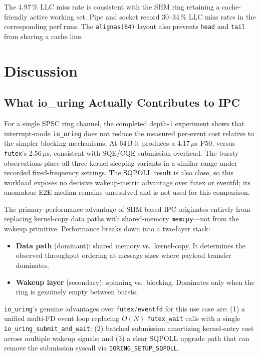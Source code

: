 \documentclass[10pt,conference]{IEEEtran}
\begin{document}
The 4.97\,\% LLC miss rate is consistent with the SHM ring retaining a
cache-friendly active working set. Pipe and socket record 30--34\,\% LLC miss
rates in the corresponding perf runs. The \texttt{alignas(64)} layout also
prevents \texttt{head} and \texttt{tail} from sharing a cache line.

\section{Discussion}
\label{sec:discussion}

\subsection{What io\_uring Actually Contributes to IPC}

For a single SPSC ring channel, the completed depth-1 experiment shows that
interrupt-mode \texttt{io\_uring} does not reduce the measured per-event cost
relative to the simpler blocking mechanisms.  At 64\,B it produces a
4.17\,$\mu$s P50, versus \texttt{futex}'s 2.56\,$\mu$s, consistent
with SQE/CQE submission overhead.  The bursty observations place all three
kernel-sleeping variants in a similar range under recorded fixed-frequency
settings.  The SQPOLL result is also close, so this workload exposes no
decisive wakeup-metric advantage over futex or eventfd; its anomalous E2E
median remains unresolved and is not used for this comparison.

The primary performance advantage of SHM-based IPC originates entirely from replacing
kernel-copy data paths with shared-memory \texttt{memcpy}---not from the wakeup
primitive.  Performance breaks down into a two-layer stack:
\begin{itemize}
  \item \textbf{Data path} (dominant): shared memory vs.\ kernel-copy.  It
        determines the observed throughput ordering at message sizes where
        payload transfer dominates.
  \item \textbf{Wakeup layer} (secondary): spinning vs.\ blocking.  Dominates only
        when the ring is genuinely empty between bursts.
\end{itemize}

\texttt{io\_uring}'s genuine advantages over \texttt{futex}/\texttt{eventfd} for this
use case are: (1) a unified multi-FD event loop replacing $O(N)$ \texttt{futex\_wait}
calls with a single \texttt{io\_uring\_submit\_and\_wait}; (2) batched submission amortizing
kernel-entry cost across multiple wakeup signals; and (3) a clear SQPOLL upgrade path
that can remove the submission syscall via \texttt{IORING\_SETUP\_SQPOLL}.
\end{document}
